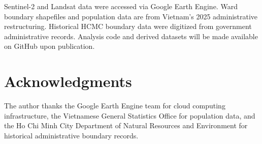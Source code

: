 \documentclass[preprint,12pt]{elsarticle}
\begin{document}
Sentinel-2 and Landsat data were accessed via Google Earth Engine. Ward boundary shapefiles and population data are from Vietnam's 2025 administrative restructuring. Historical HCMC boundary data were digitized from government administrative records. Analysis code and derived datasets will be made available on GitHub upon publication.

\section*{Acknowledgments}

The author thanks the Google Earth Engine team for cloud computing infrastructure, the Vietnamese General Statistics Office for population data, and the Ho Chi Minh City Department of Natural Resources and Environment for historical administrative boundary records.



\end{document}
